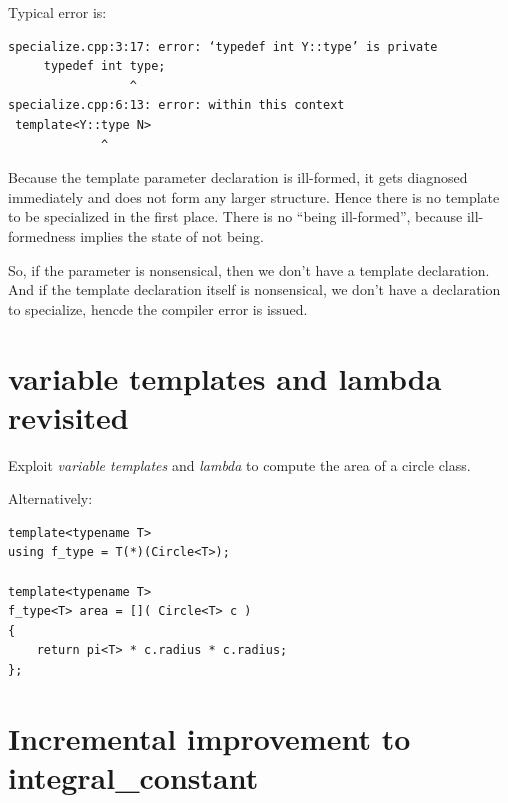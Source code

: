 \begin{Answer}[ref=ex011]
Typical error is:
\begin{verbatim}
specialize.cpp:3:17: error: ‘typedef int Y::type’ is private
     typedef int type;
                 ^
specialize.cpp:6:13: error: within this context
 template<Y::type N>
             ^
\end{verbatim}
Because the template parameter declaration is ill-formed, it gets diagnosed immediately and does not form any larger structure. Hence there is no template to be specialized in the first place. There is no ``being ill-formed'', because ill-formedness implies the state of not being.

So, if the parameter is nonsensical, then we don't have a template declaration. And if the template declaration itself is nonsensical, we don't have a declaration to specialize, hencde the compiler error is issued.
\end{Answer}




\section{variable templates and lambda revisited}

\begin{Exercise}[title={variable templates and lambda revisited}, difficulty=3, label=ex012]

Exploit \emph{variable templates} and \emph{lambda} to compute the area of a circle class.

\end{Exercise}


\begin{Answer}[ref=ex012]


Alternatively:
\begin{lstlisting}
template<typename T>
using f_type = T(*)(Circle<T>);

template<typename T>
f_type<T> area = []( Circle<T> c ) 
{
    return pi<T> * c.radius * c.radius;
};
\end{lstlisting}

\end{Answer}



\section{Incremental improvement to integral\_constant}


